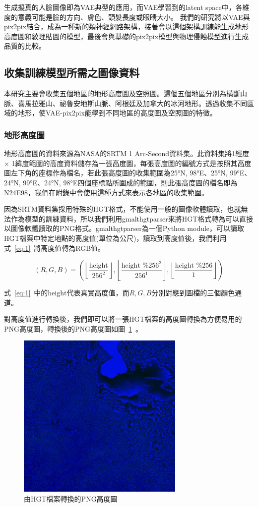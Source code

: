 \documentclass[a4paper, 12pt]{article}
\begin{document}
生成擬真的人臉圖像即為VAE典型的應用，而VAE學習到的latent space中，各維度的意義可能是臉的方向、膚色、頭髮長度或眼睛大小。
我們的研究將以VAE與pix2pix結合，成為一種新的類神經網路架構，接著會以這個架構訓練能生成地形高度圖和紋理貼圖的模型，最後會與基礎的pix2pix模型與物理侵蝕模型進行生成品質的比較。

\subsection{收集訓練模型所需之圖像資料}
本研究主要會收集五個地區的地形高度圖及空照圖。這個五個地區分別為橫斷山脈、喜馬拉雅山、祕魯安地斯山脈、阿根廷及加拿大的冰河地形。透過收集不同區域的地形，使VAE-pix2pix能學到不同地區的高度圖及空照圖的特徵。
\subsubsection{地形高度圖}
地形高度圖的資料來源為NASA的SRTM 1 Arc-Second資料集\cite{srtm1arc}。此資料集將1經度 $\times$ 1緯度範圍的高度資料儲存為一張高度圖，每張高度圖的編號方式是按照其高度圖左下角的座標作為檔名，若此張高度圖的收集範圍為25°N, 98°E、25°N, 99°E、24°N, 99°E、24°N, 98°E四個座標點所圍成的範圍，則此張高度圖的檔名即為N24E98，我們在附錄中會使用這種方式來表示各地區的收集範圍。

因為SRTM資料集採用特殊的HGT格式，不能使用一般的圖像軟體讀取，也就無法作為模型的訓練資料，所以我們利用gmalthgtparser來將HGT格式轉為可以直接以圖像軟體讀取的PNG格式。gmalthgtparser為一個Python module，可以讀取HGT檔案中特定地點的高度值(單位為公尺)，讀取到高度值後，我們利用式~\ref{eq:1}~將高度值轉為RGB值。

\begin{equation}
    (R, G, B)=\left(\left\lfloor\frac{\text {height}}{256^{2}}\right\rfloor,\left\lfloor\frac{\text {height } \% 256^{2}}{256^{1}}\right\rfloor,\left\lfloor\frac{\text {height } \% 256}{1}\right\rfloor\right)
    \label{eq:1}
\end{equation}

式~\ref{eq:1}~中的$\text{height}$代表真實高度值，而$R,G,B$分別對應到圖檔的三個顏色通道。

對高度值進行轉換後，我們即可以將一張HGT檔案的高度圖轉換為方便易用的PNG高度圖，轉換後的PNG高度圖如圖~\ref{fig:5}~。

\begin{figure}[H]
    \centering
    \includegraphics[width=0.45\linewidth]{fig/5.jpg}
    \caption{由HGT檔案轉換的PNG高度圖}
    \label{fig:5}
\end{figure}
\end{document}
